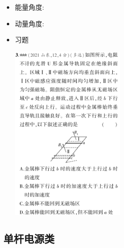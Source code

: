 \documentclass{article}
\begin{document}
\begin{itemize}
    \item 能量角度:
          \vspace{5em}
    \item 动量角度:
          \vspace{5em}
    \item 习题

          \centering
          \includegraphics[width = 0.45\textwidth]{./pictures/18.png}

\end{itemize}

\vspace{2em}

\subsection{单杆电源类}
\end{document}
